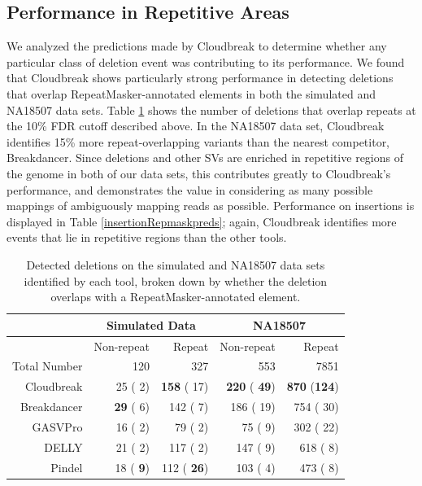 \documentclass[11pt]{article}
\begin{document}
\subsection{Performance in Repetitive Areas}

We analyzed the predictions made by Cloudbreak to determine whether any particular class of deletion event was contributing to its performance. We found that Cloudbreak shows particularly strong performance in detecting deletions that overlap RepeatMasker-annotated elements in both the simulated and NA18507 data sets. Table \ref{deletionRepmaskpreds} shows the number of deletions that overlap repeats at the 10\% FDR cutoff described above. In the NA18507 data set, Cloudbreak identifies 15\% more repeat-overlapping variants than the nearest competitor, Breakdancer. Since deletions and other SVs are enriched in repetitive regions of the genome in both of our data sets, this contributes greatly to Cloudbreak's performance, and demonstrates the value in considering as many possible mappings of ambiguously mapping reads as possible. Performance on insertions is displayed in Table \ref{insertionRepmaskpreds}; again, Cloudbreak identifies more events that lie in repetitive regions than the other tools.

\begin{table}
\begin{center}
\begin{tabular}{rrr|rr}
 & \multicolumn{2}{c}{Simulated Data} & \multicolumn{2}{c}{NA18507} \\
\hline
 &  Non-repeat & Repeat  &  Non-repeat & Repeat \\ 
 Total Number & 120 & 327 & 553 & 7851 \\ 
  \hline
  Cloudbreak  &  25 (  2) & \textbf{158} ( 17) & \textbf{220} (\textbf{ 49}) & \textbf{870} (\textbf{124}) \\ 
  Breakdancer & \textbf{ 29} (  6) & 142 (  7) & 186 ( 19) & 754 ( 30) \\
  GASVPro     &  16 (  2) &  79 (  2) &  75 (  9) & 302 ( 22) \\
  DELLY       &  21 (  2) & 117 (  2) & 147 (  9) & 618 (  8) \\
  Pindel      &  18 (\textbf{  9}) & 112 (\textbf{ 26}) & 103 (  4) & 473 (  8) \\ 
   \hline
\end{tabular}
\end{center}
\caption{Detected deletions on the simulated and NA18507 data sets identified by each tool, broken down by whether the deletion overlaps with a RepeatMasker-annotated element.}
\label{deletionRepmaskpreds}
\end{table}
\end{document}
